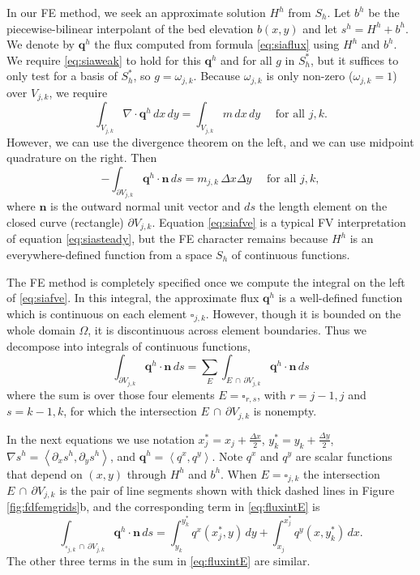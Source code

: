 \documentclass[11pt]{amsart}
\newcommand\bn{\mathbf{n}}
\newcommand\bq{\mathbf{q}}
\newcommand{\Div}{\nabla\cdot}
\newcommand{\grad}{\nabla}
\newcommand{\ip}[2]{\ensuremath{\left<#1,#2\right>}}
\begin{document}
In our FE method, we seek an approximate solution $H^h$ from $S_h$.  Let $b^h$ be the piecewise-bilinear interpolant of the bed elevation $b(x,y)$ and let $s^h=H^h+b^h$.  We denote by $\bq^h$ the flux computed from formula \eqref{eq:siaflux} using $H^h$ and $b^h$.  We require \eqref{eq:siaweak} to hold for this $\bq^h$ and for all $g$ in $S_h^*$, but it suffices to only test for a basis of $S_h^*$, so $g=\omega_{j,k}$.  Because $\omega_{j,k}$ is only non-zero ($\omega_{j,k}=1$) over $V_{j,k}$, we require
\begin{equation}
  \int_{V_{j,k}} \Div \bq^h \,dx\,dy = \int_{V_{j,k}} m \,dx\,dy \quad \text{ for all } j,k.  \label{eq:siafve-transition}
\end{equation}
However, we can use the divergence theorem on the left, and we can use midpoint quadrature \cite{Elmanetal2005} on the right.  Then
\begin{equation}
  - \int_{\partial V_{j,k}} \bq^h \cdot \bn\,ds = m_{j,k}\, \Delta x \Delta y \quad \text{ for all } j,k, \label{eq:siafve}
\end{equation}
where $\bn$ is the outward normal unit vector and $ds$ the length element on the closed curve (rectangle) $\partial V_{j,k}$.  Equation \eqref{eq:siafve} is a typical FV interpretation of equation \eqref{eq:siasteady}, but the FE character remains because $H^h$ is an everywhere-defined function from a space $S_h$ of continuous functions.

\newcommand{\dxtwo}{\tfrac{\Delta x}{2}}
\newcommand{\dytwo}{\tfrac{\Delta y}{2}}

The FE method is completely specified once we compute the integral on the left of \eqref{eq:siafve}.  In this integral, the approximate flux $\bq^h$ is a well-defined function which is continuous on each element $\square_{j,k}$.  However, though it is bounded on the whole domain $\Omega$, it is discontinuous across element boundaries.  Thus we decompose into integrals of continuous functions,
\begin{equation}
  \int_{\partial V_{j,k}} \bq^h \cdot \bn\,ds = \sum_{E} \int_{E\, \cap \, \partial V_{j,k}} \bq^h \cdot \bn\,ds \label{eq:fluxintE}
\end{equation}
where the sum is over those four elements $E=\square_{r,s}$, with $r=j-1,j$ and $s=k-1,k$, for which the intersection $E\, \cap \, \partial V_{j,k}$ is nonempty.

In the next equations we use notation $x_j^*=x_j+\dxtwo$, $y_k^*=y_k+\dytwo$, $\grad s^h = \ip{\partial_x s^h}{\partial_y s^h}$, and $\bq^h = \ip{q^x}{q^y}$.  Note $q^x$ and $q^y$ are scalar functions that depend on $(x,y)$ through $H^h$ and $b^h$.  When $E=\square_{j,k}$ the intersection $E\, \cap \, \partial V_{j,k}$ is the pair of line segments shown with thick dashed lines in Figure \ref{fig:fdfemgrids}b, and the corresponding term in \eqref{eq:fluxintE} is
\begin{equation}
\int_{\square_{j,k}\, \cap \, \partial V_{j,k}} \bq^h \cdot \bn\,ds = \int_{y_k}^{y_k^*} q^x(x_j^*,y) \,dy + \int_{x_j}^{x_j^*} q^y(x,y_k^*) \,dx.
\end{equation}
The other three terms in the sum in \eqref{eq:fluxintE} are similar.
\end{document}
